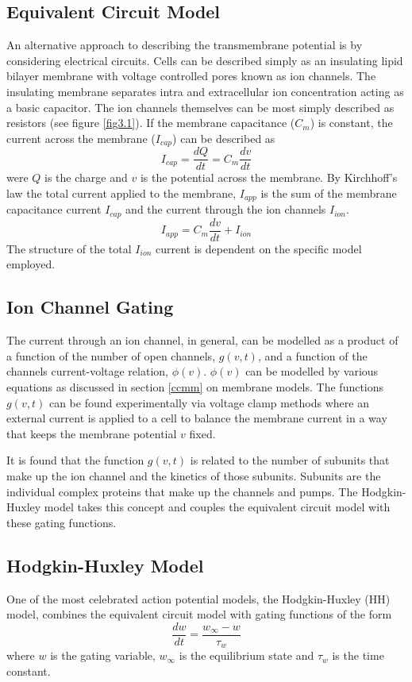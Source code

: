 \subsection{Equivalent Circuit Model}
An alternative approach to describing the transmembrane potential is by considering electrical circuits. Cells can be described simply as an insulating lipid bilayer membrane with voltage controlled pores known as ion channels. The insulating membrane separates intra and extracellular ion concentration acting as a basic capacitor. The ion channels themselves can be most simply described as resistors (see figure \ref{fig3.1}). If the membrane capacitance ($C_m$) is constant, the current across the membrane ($I_{cap}$) can be described as
\begin{equation}
    I_{cap} = \frac{dQ}{dt} = C_m\frac{dv}{dt}
\end{equation}
were $Q$ is the charge and $v$ is the potential across the membrane. By Kirchhoff's law the total current applied to the membrane, $I_{app}$ is the sum of the membrane capacitance current $I_{cap}$ and the current through the ion channels $I_{ion}$.
\begin{equation}
    I_{app}=C_m\frac{dv}{dt}+I_{ion}
\end{equation}
The structure of the total $I_{ion}$ current is dependent on the specific model employed.

\subsection{Ion Channel Gating}
The current through an ion channel, in general, can be modelled as a product of a function of the number of open channels, $g(v,t)$, and a function of the channels current-voltage relation, $\phi(v)$. $\phi(v)$ can be modelled by various equations as discussed in section \ref{ccmm} on membrane models. The functions $g(v,t)$ can be found experimentally via voltage clamp methods where an external current is applied to a cell to balance the membrane current in a way that keeps the membrane potential $v$ fixed.\par

It is found that the function $g(v,t)$ is related to the number of subunits that make up the ion channel and the kinetics of those subunits. Subunits are the individual complex proteins that make up the channels and pumps. The Hodgkin-Huxley model takes this concept and couples the equivalent circuit model with these gating functions.

\subsection{Hodgkin-Huxley Model}
One of the most celebrated action potential models, the Hodgkin-Huxley (HH) model, combines the equivalent circuit model with gating functions of the form
\begin{equation}
    \frac{dw}{dt} = \frac{w_\infty - w}{\tau_w}
\end{equation}
where $w$ is the gating variable, $w_\infty$ is the equilibrium state and $\tau_w$ is the time constant. \par

